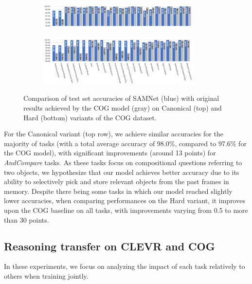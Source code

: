 \begin{figure}[htb]
	\centering
	\begin{subfigure}{\textwidth}
		\centering
		\includegraphics[width=0.9\textwidth]{img/results/samnet_cog_orig_canonical_no_labels.png}
	\end{subfigure}%
	\newline
	\begin{subfigure}{\textwidth}
		\centering
		\includegraphics[width=0.9\textwidth]{img/results/samnet_cog_orig_hard.png}
	\end{subfigure}%
	\caption{Comparison of test set accuracies of SAMNet (blue) with original results achieved by the COG model (gray) on Canonical (top) and Hard (bottom) variants of the COG dataset.}
	\label{fig:samnet_cog_detailed}
\end{figure}

For the Canonical variant (top row), we achieve similar accuracies for the majority of tasks (with a total average accuracy of 98.0\%, compared to 97.6\% for the COG model), with significant improvements (around 13 points) for \textit{AndCompare} tasks.
As these tasks focus on compositional questions referring to two objects, we hypothesize that our model achieves better accuracy due to its ability to selectively pick and store relevant objects from the past frames in memory.
Despite there being some tasks in which our model reached slightly lower accuracies,
when comparing performances on the Hard variant, it improves upon the COG baseline on all tasks, with improvements varying from 0.5 to more than 30 points.

\subsection{Reasoning transfer on CLEVR and COG}
\label{sec:reasoning}
In these experiments, we focus on analyzing the impact of each task relatively to others when training jointly.


